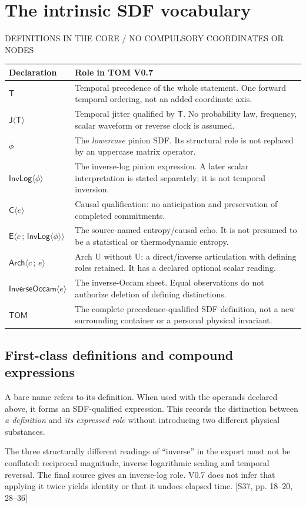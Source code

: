 \documentclass[11pt,a4paper]{article}
\newcommand{\newsec}[2]{\clearpage\section{#1}{\sffamily\footnotesize\color{teal}\MakeUppercase{#2}\par}\vspace{5pt}}
\newcommand{\src}[1]{{\small\color{muted}[S37, #1]}}
\newcommand{\Tom}{\mathsf{TOM}}
\newcommand{\Ti}{\mathsf T}
\newcommand{\Ji}{\mathsf J}
\newcommand{\Ca}{\mathsf C}
\newcommand{\En}{\mathsf E}
\newcommand{\IL}{\mathsf{InvLog}}
\newcommand{\IO}{\mathsf{InverseOccam}}
\newcommand{\Ar}{\mathsf{Arch}}
\newcommand{\bind}[1]{\langle #1\rangle}
\begin{document}
\newsec{The intrinsic SDF vocabulary}{Definitions in the core / no compulsory coordinates or nodes}
\small
\begin{tabularx}{\linewidth}{@{}P{31mm}Y@{}}
\toprule
\textbf{Declaration} & \textbf{Role in TOM V0.7}\\\midrule
$\Ti$ & Temporal precedence of the whole statement. One forward temporal ordering, not an added coordinate axis.\\
$\Ji\bind{\Ti}$ & Temporal jitter qualified by $\Ti$. No probability law, frequency, scalar waveform or reverse clock is assumed.\\
$\phi$ & The \emph{lowercase} pinion SDF. Its structural role is not replaced by an uppercase matrix operator.\\
$\IL\bind{\phi}$ & The inverse-log pinion expression. A later scalar interpretation is stated separately; it is not temporal inversion.\\
$\Ca\bind{e}$ & Causal qualification: no anticipation and preservation of completed commitments.\\
$\En\bind{c\,;\,\IL\bind{\phi}}$ & The source-named entropy/causal echo. It is not presumed to be a statistical or thermodynamic entropy.\\
$\Ar\bind{c\,;\,e}$ & Arch U without U: a direct/inverse articulation with defining roles retained. It has a declared optional scalar reading.\\
$\IO\bind{e}$ & The inverse-Occam sheet. Equal observations do not authorize deletion of defining distinctions.\\
$\Tom$ & The complete precedence-qualified SDF definition, not a new surrounding container or a personal physical invariant.\\
\bottomrule
\end{tabularx}
\normalsize

\subsection{First-class definitions and compound expressions}
A bare name refers to its definition. When used with the operands declared above, it forms an SDF-qualified expression. This records the distinction between \emph{a definition} and \emph{its expressed role} without introducing two different physical substances.

The three structurally different readings of ``inverse'' in the export must not be conflated: reciprocal magnitude, inverse logarithmic scaling and temporal reversal. The final source gives an inverse-log role. V0.7 does not infer that applying it twice yields identity or that it undoes elapsed time. \src{pp. 18--20, 28--36}
\end{document}
